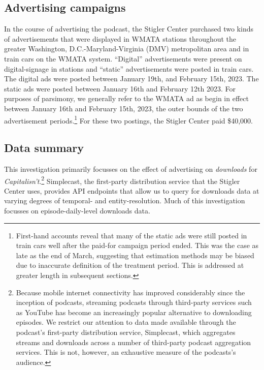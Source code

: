 \documentclass[11pt, letterpaper, twoside]{article}
\begin{document}
\subsection{Advertising campaigns}
In the course of advertising the podcast, the Stigler Center purchased two kinds of advertisements that were displayed in WMATA stations throughout the greater Washington, D.C.-Maryland-Virginia (DMV) metropolitan area and in train cars on the WMATA system. ``Digital'' advertisements were present on digital-signage in stations and ``static'' advertisements were posted in train cars. The digital ads were posted between January 19th, and February 15th, 2023. The static ads were posted between January 16th and February 12th 2023. For purposes of parsimony, we generally refer to the WMATA ad as begin in effect between January 16th and February 15th, 2023, the outer bounds of the two advertisement periods.\footnote{First-hand accounts reveal that many of the static ads were still posted in train cars well after the paid-for campaign period ended. This was the case as late as the end of March, suggesting that estimation methods may be biased due to inaccurate definition of the treatment period. This is addressed at greater length in subsequent sections.} For these two postings, the Stigler Center paid \$40,000.

\subsection{Data summary}
This investigation primarily focusses on the effect of advertising on \textit{downloads} for \textit{Capitalisn't}.\footnote{Because mobile internet connectivity has improved considerably since the inception of podcasts, streaming podcasts through third-party services such as YouTube has become an increasingly popular alternative to downloading episodes. We restrict our attention to data made available through the podcast's first-party distribution service, Simplecast, which aggregates streams and downloads across a number of third-party podcast aggregation services. This is not, however, an exhaustive measure of the podcasts's audience.} Simplecast, the first-party distribution service that the Stigler Center uses, provides API endpoints that allow us to query for downloads data at varying degrees of temporal- and entity-resolution. Much of this investigation focusses on episode-daily-level downloads data.\\
\end{document}
